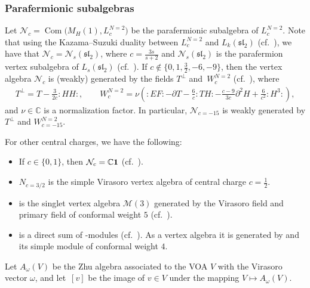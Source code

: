 \documentclass[11pt]{article}
\numberwithin{equation}{section}
\newcommand{\C}{\mathbb C}
\begin{document}
\subsubsection{Parafermionic subalgebras}
\label{paraferm-1}
Let $ \mathcal N_c = \operatorname{Com} \bigl(M_H(1) , L^{N=2}_{c}\bigr) $ be the parafermionic subalgebra of $L^{N=2}_{c}$. Note that using the Kazama--Suzuki duality between $L^{N=2} _c$ and $L_k(\mathfrak{sl}_2)$ (cf.\ \cite{A-IMRN, FST}), we have that
$\mathcal N_c = \mathcal N_s (\mathfrak{sl}_2)$, where $c =\frac{3s}{s+2}$ and
$\mathcal N_s (\mathfrak{sl}_2)$ is the parafermion vertex subalgebra of $L_s(\mathfrak{sl}_2)$ (cf.\ \cite{DLY}). If $c \notin \{ 0, 1, \frac{3}{2}, -6, -9\}$, then the vertex algebra $ \mathcal N_c $ is (weakly) generated by the fields $ T^{\perp}$ and~$W^{N=2}_{c}$ (cf.\ \cite{BEHHH,DLY}), where
\begin{gather*}
	 T^{\perp} = T - \frac{3}{2c}{:}HH{:}, \qquad
	W^{N=2}_{c} = \nu \left({:} E F{:} - \partial T -\frac{6}{c}{:} T H{:} - \frac{c-9}{3c}\partial^2H + \frac{6}{c^2}{:}H^3{:} \right),
\end{gather*}
and $\nu \in \mathbb{C}$ is a normalization factor. In particular, $\mathcal N_{c=-15}$ is weakly generated by $T^{\perp}$ and $W^{N=2}_{c=-15}$.

 For other central charges, we have the following:
\begin{itemize}\itemsep=0pt
\item If $c\in \{ 0, 1\}$, then $\mathcal N_c = {\C} {\bf 1}$ (cf.\ \cite{DLY}).
\item $N_{c=3/2}$ is the simple Virasoro vertex algebra of central charge $c=\frac{1}{2}$.
 \item {} is the singlet vertex algebra $\mathcal M(3)$ generated by the Virasoro field and primary field of conformal weight $5$ (cf.\ \cite{A-2005}).
 \item {} is a direct sum of -modules (cf.\ \cite{AMW}). As a vertex algebra it is generated by  and its simple module of conformal weight $4$.
\end{itemize}

 Let $A_{\omega}(V)$ be the Zhu algebra associated to the VOA $V$ with the Virasoro vector $\omega$, and let~$[v]$ be the image of $v \in V $ under the mapping $V \mapsto A_{\omega}(V)$.
\end{document}
